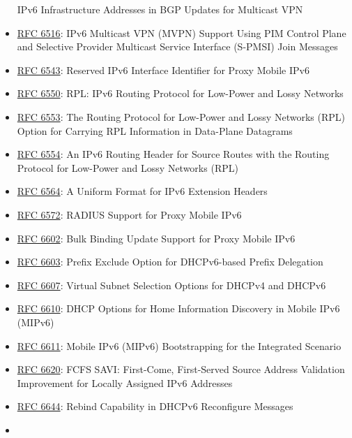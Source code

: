 \documentclass[
]{article}
\begin{document}
\begin{itemize}
  IPv6 Infrastructure Addresses in BGP Updates for Multicast VPN
\item
  \href{https://www.rfc-editor.org/info/rfc6516}{RFC 6516}: IPv6
  Multicast VPN (MVPN) Support Using PIM Control Plane and Selective
  Provider Multicast Service Interface (S-PMSI) Join Messages
\item
  \href{https://www.rfc-editor.org/info/rfc6543}{RFC 6543}: Reserved
  IPv6 Interface Identifier for Proxy Mobile IPv6
\item
  \href{https://www.rfc-editor.org/info/rfc6550}{RFC 6550}: RPL: IPv6
  Routing Protocol for Low-Power and Lossy Networks
\item
  \href{https://www.rfc-editor.org/info/rfc6553}{RFC 6553}: The Routing
  Protocol for Low-Power and Lossy Networks (RPL) Option for Carrying
  RPL Information in Data-Plane Datagrams
\item
  \href{https://www.rfc-editor.org/info/rfc6554}{RFC 6554}: An IPv6
  Routing Header for Source Routes with the Routing Protocol for
  Low-Power and Lossy Networks (RPL)
\item
  \href{https://www.rfc-editor.org/info/rfc6564}{RFC 6564}: A Uniform
  Format for IPv6 Extension Headers
\item
  \href{https://www.rfc-editor.org/info/rfc6572}{RFC 6572}: RADIUS
  Support for Proxy Mobile IPv6
\item
  \href{https://www.rfc-editor.org/info/rfc6602}{RFC 6602}: Bulk Binding
  Update Support for Proxy Mobile IPv6
\item
  \href{https://www.rfc-editor.org/info/rfc6603}{RFC 6603}: Prefix
  Exclude Option for DHCPv6-based Prefix Delegation
\item
  \href{https://www.rfc-editor.org/info/rfc6607}{RFC 6607}: Virtual
  Subnet Selection Options for DHCPv4 and DHCPv6
\item
  \href{https://www.rfc-editor.org/info/rfc6610}{RFC 6610}: DHCP Options
  for Home Information Discovery in Mobile IPv6 (MIPv6)
\item
  \href{https://www.rfc-editor.org/info/rfc6611}{RFC 6611}: Mobile IPv6
  (MIPv6) Bootstrapping for the Integrated Scenario
\item
  \href{https://www.rfc-editor.org/info/rfc6620}{RFC 6620}: FCFS SAVI:
  First-Come, First-Served Source Address Validation Improvement for
  Locally Assigned IPv6 Addresses
\item
  \href{https://www.rfc-editor.org/info/rfc6644}{RFC 6644}: Rebind
  Capability in DHCPv6 Reconfigure Messages
\item

\end{itemize}
\end{document}
